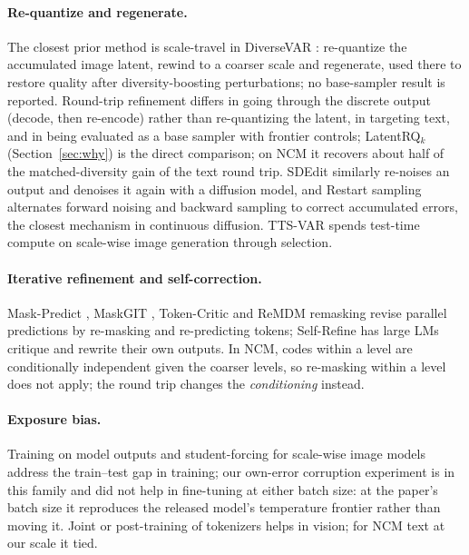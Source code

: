 \documentclass[10pt]{article}
\begin{document}
\paragraph{Re-quantize and regenerate.} The closest prior method is scale-travel in DiverseVAR \citep{park2025diversevar}: re-quantize the accumulated image latent, rewind to a coarser scale and regenerate, used there to restore quality after diversity-boosting perturbations; no base-sampler result is reported. Round-trip refinement differs in going through the discrete output (decode, then re-encode) rather than re-quantizing the latent, in targeting text, and in being evaluated as a base sampler with frontier controls; LatentRQ$_k$ (Section~\ref{sec:why}) is the direct comparison; on NCM it recovers about half of the matched-diversity gain of the text round trip. SDEdit \citep{meng2021sdedit} similarly re-noises an output and denoises it again with a diffusion model, and Restart sampling \citep{xu2023restart} alternates forward noising and backward sampling to correct accumulated errors, the closest mechanism in continuous diffusion. TTS-VAR \citep{chen2025ttsvar} spends test-time compute on scale-wise image generation through selection.

\paragraph{Iterative refinement and self-correction.} Mask-Predict \citep{ghazvininejad2019maskpredict}, MaskGIT \citep{chang2022maskgit}, Token-Critic \citep{lezama2022tokencritic} and ReMDM remasking \citep{wang2025remdm} revise parallel predictions by re-masking and re-predicting tokens; Self-Refine \citep{madaan2023selfrefine} has large LMs critique and rewrite their own outputs. In NCM, codes within a level are conditionally independent given the coarser levels, so re-masking within a level does not apply; the round trip changes the \emph{conditioning} instead.

\paragraph{Exposure bias.} Training on model outputs \citep{bengio2015scheduled,savinov2021sundae} and student-forcing for scale-wise image models \citep{zhou2025sar} address the train--test gap in training; our own-error corruption experiment is in this family and did not help in fine-tuning at either batch size: at the paper's batch size it reproduces the released model's temperature frontier rather than moving it. Joint or post-training of tokenizers \citep{wang2024larp,leng2025repae,qiu2025tokpost} helps in vision; for NCM text at our scale it tied.
\end{document}
